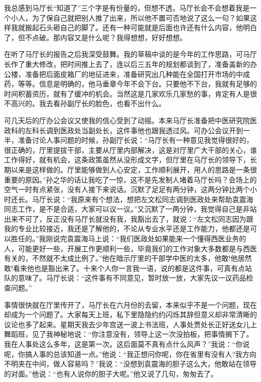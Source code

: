 \documentclass[12pt,oneside]{book}
\begin{document}
我总感到马厅长``知道了''三个字是有份量的，但想不透。马厅长会不会想着我是一个小人，为了保自己就把别人推了出来，所以他不置可否地说了这么一句？如果这样我就搬起石头砸自己的脚了。还有一种可能就是后面也许还有什么内容，他明白了，但不点破。那内容又是什么呢？我得想想，好好想想。

在听了马厅长的报告之后我深受鼓舞。我的草稿中谈的是今年的工作思路，可马厅长作了重大修改，把时间推上去了，连以后三五年的规划都谈到了，准备盖新的办公楼，准备把后面皮箱厂的地征进来，准备研究出几种能在全国打开市场的中成药，等等。信息是明确的，他马垂章今年不会下台。只要他不下台，我就有足够的时间积蓄资历，就有了缓冲的机会。当然这是几家欢乐几家愁的事，肯定有人是很不高兴的。我去看孙副厅长的脸色，也看不出什么。

可几天后的厅办公会议又使我的信心受到了动摇。本来马厅长准备把中医研究院医政科的左科长调到医政处当副处长，这件事他也跟我透过风。可办公会议开到一半，准备讨论人事问题的时候，孙副厅长说：``马厅长有一种意见我觉得很好的，很正确的，厅里提拔干部，主要从厅里内部解决，这是对厅里广大干部的关心，谁工作得好，就有机会，这条政策虽然从没形成文字，但厅里在马厅长的领导下，长期以来是这样做的。厅里能够做到人心安定，工作顺利展开，用人的思路是一条很重要的原因。''孙之华的话让我吃了一惊，这不是先发制人堵着马厅长吗？会场上的空气一时有点紧张，没有人接下来说话。沉默了足足有两分钟，这两分钟比两个小时还长。马厅长说：``我原来有个想法，想把左文松同志调到医政处来帮助袁震海同志工作，是不是合适，大家可以议一议。''又沉默了一两分钟，我觉得自己是非站出来不可了，反正没有马厅长就没有我，我豁出去了，就说：``左文松同志因为跟我的专业比较接近，我还是了解他的，不论从专业水平还是工作能力，他都还是可以胜任的。''我刚说完袁震海马上说：``我们医政处如果能来一个懂得西医业务的人，可能更好一些，开展工作更顺利一些，毕竟我们的工作对象大多数都是与西医有关的，不然就不太成比例了。''他在暗示厅里的干部学中医的太多，他敢!他居然敢!看来他也是豁出来了。十来个人你一言我一语，说的都是这件事，可真有点站队的意味了。马厅长说：``这件事有不同意见，暂时放一放，大家先议一议药品检查问题。''

事情很快就在厅里传开了，马厅长在六月份的去留，本来似乎不是一个问题，现在却成为一个问题了。大家每天上班，私下里隐隐约约闪烁其辞但意义却非常清晰的议论也多了起来。星期天我去少年宫送一波上书法班，人事处贾处长正好送女儿上舞蹈班，见了我神秘地说：``你注意没有，领导上这一次没拍板，把事情搁下了。我在人事处这么多年，这是第一次。这后面莫不真有点什么风声？''我说：``你说呢，你搞人事的总该知道一点。''他说：``我正想问你呢，你在省里有没有人?我方向不明夹在中间，做人容易吗？''我说：``没想到袁震海的胆子这么大，他敢站在领导的对面。''他说：``也有人说你的胆子大呢。''他又说了几句，匆匆去了。
\end{document}

